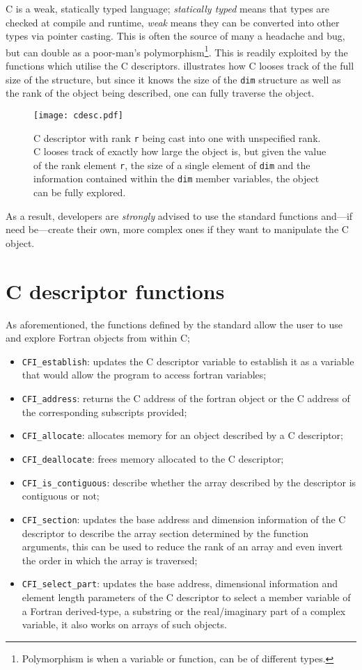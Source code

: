 C is a weak, statically typed language; \emph{statically typed} means that types are checked at compile and runtime, \emph{weak} means they can be converted into other types via pointer casting. This is often the source of many a headache and bug, but can double as a poor-man's polymorphism\footnote{Polymorphism is when a variable or function, can be of different types.}. This is readily exploited by the functions which utilise the C descriptors.  illustrates how C looses track of the full size of the structure, but since it knows the size of the \texttt{dim} structure as well as the rank of the object being described, one can fully traverse the object.
\begin{figure}
    \centering
    \texttt{[image: cdesc.pdf]}
    \caption{C descriptor with rank \texttt{r} being cast into one with unspecified rank. C looses track of exactly how large the object is, but given the value of the rank element \texttt{r}, the size of a single element of \texttt{dim} and the information contained within the \texttt{dim} member variables, the object can be fully explored.}
    \label{f:cast}
\end{figure}
As a result, developers are \emph{strongly} advised to use the standard functions and---if need be---create their own, more complex ones if they want to manipulate the C object.

\section{C descriptor functions}

As aforementioned, the functions defined by the standard \cite{fortran} allow the user to use and explore Fortran objects from within C;
\begin{itemize}
    \item \texttt{CFI\_establish}: updates the C descriptor variable to establish it as a variable that would allow the program to access fortran variables;
    \item \texttt{CFI\_address}: returns the C address of the fortran object or the C address of the corresponding subscripts provided;
    \item \texttt{CFI\_allocate}: allocates memory for an object described by a C descriptor;
    \item \texttt{CFI\_deallocate}: frees memory allocated to the C descriptor;
    \item \texttt{CFI\_is\_contiguous}: describe whether the array described by the descriptor is contiguous or not;
    \item \texttt{CFI\_section}: updates the base address and dimension information of the C descriptor to describe the array section determined by the function arguments, this can be used to reduce the rank of an array and even invert the order in which the array is traversed;
    \item \texttt{CFI\_select\_part}: updates the base address, dimensional information and element length parameters of the C descriptor to select a member variable of a Fortran derived-type, a substring or the real/imaginary part of a complex variable, it also works on arrays of such objects.
\end{itemize}

